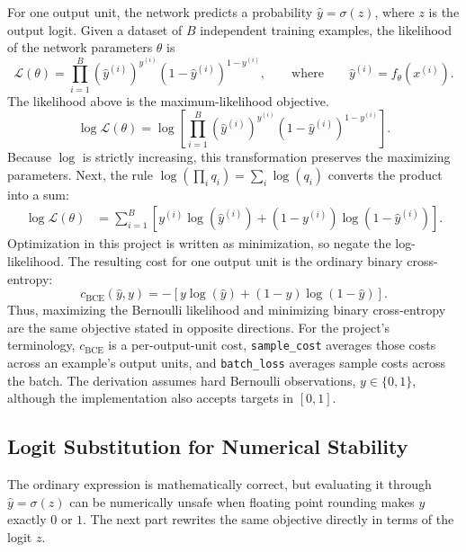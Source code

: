 \documentclass{article}
\begin{document}
For one output unit, the network predicts a probability
\(\hat{y}=\sigma(z)\), where \(z\) is the output logit. Given a dataset
of \(B\) independent training examples, the likelihood of the network
parameters \(\theta\) is
\[
  \mathcal{L}(\theta)
  =
  \prod_{i=1}^{B}
  \left(\hat{y}^{(i)}\right)^{y^{(i)}}
  \left(1-\hat{y}^{(i)}\right)^{1-y^{(i)}},
  \qquad \text{where} \qquad
  \hat{y}^{(i)}=f_\theta\!\left(x^{(i)}\right).
\]
The likelihood above is the maximum-likelihood objective.
\[
  \log \mathcal{L}(\theta)
  =
  \log\!\left[
    \prod_{i=1}^{B}
    \left(\hat{y}^{(i)}\right)^{y^{(i)}}
    \left(1-\hat{y}^{(i)}\right)^{1-y^{(i)}}
  \right].
\]
Because \(\log\) is strictly increasing, this transformation preserves
the maximizing parameters. Next, the rule
\(\log(\prod_i q_i)=\sum_i\log(q_i)\) converts the product into a sum:
\[
  \begin{aligned}
    \log \mathcal{L}(\theta)
    &=
    \sum_{i=1}^{B}
    \left[
      y^{(i)}\log\!\left(\hat{y}^{(i)}\right)
      +
      \left(1-y^{(i)}\right)
      \log\!\left(1-\hat{y}^{(i)}\right)
    \right].
  \end{aligned}
\]
Optimization in this project is written as minimization, so negate the
log-likelihood. The resulting cost for one output unit is the ordinary
binary cross-entropy:
\[
  c_{\mathrm{BCE}}\!\left(\hat{y}, y\right)
  =
  -\left[
    y\log(\hat{y})
    +
    (1-y)\log(1-\hat{y})
  \right].
\]
Thus, maximizing the Bernoulli likelihood and minimizing binary
cross-entropy are the same objective stated in opposite directions. For
the project's terminology, \(c_{\mathrm{BCE}}\) is a per-output-unit cost,
\texttt{sample\_cost} averages those costs across an example's output
units, and \texttt{batch\_loss} averages sample costs across the batch.
The derivation assumes hard Bernoulli observations, \(y \in \{0,1\}\),
although the implementation also accepts targets in \([0,1]\).

\subsection{Logit Substitution for Numerical Stability}

The ordinary expression is mathematically correct, but evaluating it
through \(\hat{y}=\sigma(z)\) can be numerically unsafe when floating
point rounding makes \(\hat{y}\) exactly \(0\) or \(1\). The next part
rewrites the same objective directly in terms of the logit \(z\).
\end{document}
